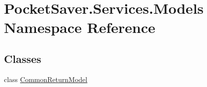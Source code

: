 \hypertarget{namespace_pocket_saver_1_1_services_1_1_models}{}\section{Pocket\+Saver.\+Services.\+Models Namespace Reference}
\label{namespace_pocket_saver_1_1_services_1_1_models}
\subsection*{Classes}
\begin{DoxyCompactItemize}
\item 
class \hyperlink{class_pocket_saver_1_1_services_1_1_models_1_1_common_return_model}{Common\+Return\+Model}
\end{DoxyCompactItemize}
